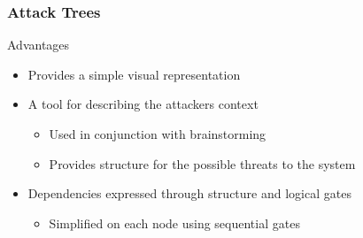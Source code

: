 

\begin{frame}\frametitle{Attack Trees}
  \begin{block}{Advantages}
    \begin{itemize}
      \item Provides a simple visual representation
      \item A tool for describing the attackers context
      \begin{itemize}
        \item Used in conjunction with brainstorming
        \item Provides structure for the possible threats to the system
      \end{itemize}
      \item Dependencies expressed through structure and logical gates
      \begin{itemize}
        \item Simplified on each node using sequential gates
      \end{itemize}
    \end{itemize}
  \end{block}
\end{frame}





